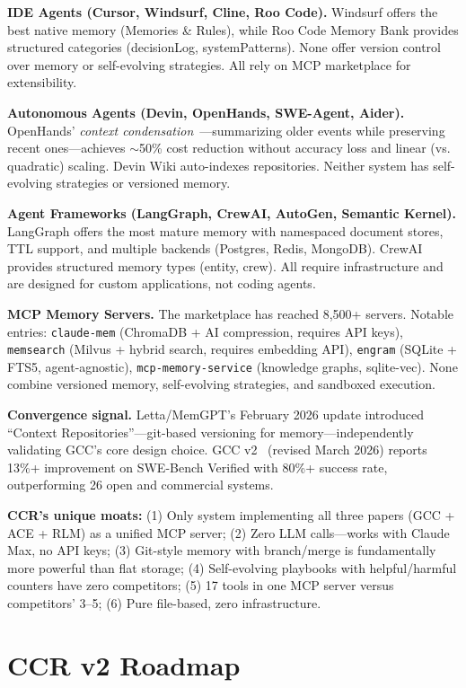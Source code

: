 \documentclass[11pt]{article}
\begin{document}
\textbf{IDE Agents (Cursor, Windsurf, Cline, Roo Code).} Windsurf offers the best native memory (Memories \& Rules), while Roo Code Memory Bank provides structured categories (decisionLog, systemPatterns). None offer version control over memory or self-evolving strategies. All rely on MCP marketplace for extensibility.

\textbf{Autonomous Agents (Devin, OpenHands, SWE-Agent, Aider).} OpenHands' \textit{context condensation}~\cite{openhands_condensation}---summarizing older events while preserving recent ones---achieves $\sim$50\% cost reduction without accuracy loss and linear (vs. quadratic) scaling. Devin Wiki auto-indexes repositories. Neither system has self-evolving strategies or versioned memory.

\textbf{Agent Frameworks (LangGraph, CrewAI, AutoGen, Semantic Kernel).} LangGraph offers the most mature memory with namespaced document stores, TTL support, and multiple backends (Postgres, Redis, MongoDB). CrewAI provides structured memory types (entity, crew). All require infrastructure and are designed for custom applications, not coding agents.

\textbf{MCP Memory Servers.} The marketplace has reached 8,500+ servers. Notable entries: \texttt{claude-mem} (ChromaDB + AI compression, requires API keys), \texttt{memsearch} (Milvus + hybrid search, requires embedding API), \texttt{engram} (SQLite + FTS5, agent-agnostic), \texttt{mcp-memory-service} (knowledge graphs, sqlite-vec). None combine versioned memory, self-evolving strategies, and sandboxed execution.

\textbf{Convergence signal.} Letta/MemGPT's February 2026 update introduced ``Context Repositories''---git-based versioning for memory---independently validating GCC's core design choice. GCC v2~\cite{gcc} (revised March 2026) reports 13\%+ improvement on SWE-Bench Verified with 80\%+ success rate, outperforming 26 open and commercial systems.

\textbf{CCR's unique moats:} (1) Only system implementing all three papers (GCC + ACE + RLM) as a unified MCP server; (2) Zero LLM calls---works with Claude Max, no API keys; (3) Git-style memory with branch/merge is fundamentally more powerful than flat storage; (4) Self-evolving playbooks with helpful/harmful counters have zero competitors; (5) 17 tools in one MCP server versus competitors' 3--5; (6) Pure file-based, zero infrastructure.

\section{CCR v2 Roadmap}
\label{sec:roadmap}
\end{document}

